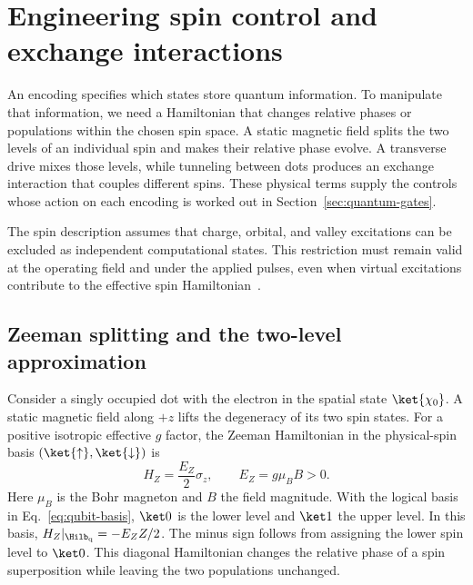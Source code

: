 \section{Engineering spin control and exchange interactions}
\label{sec:spin-control-exchange}

An encoding specifies which states store quantum information.
To manipulate that information, we need a Hamiltonian that changes
relative phases or populations within the chosen spin space.
A static magnetic field splits the two levels of an individual
spin and makes their relative phase evolve. A transverse drive
mixes those levels, while tunneling between dots produces an
exchange interaction that couples different spins. These physical
terms supply the controls whose action on each encoding is worked
out in Section~\ref{sec:quantum-gates}.

The spin description assumes that charge, orbital, and valley
excitations can be excluded as independent computational states.
This restriction must remain valid at the operating field and
under the applied pulses, even when virtual excitations contribute
to the effective spin Hamiltonian~\cite{Burkard2023}.

\subsection{Zeeman splitting and the two-level approximation}
\label{sec:platform-encoding}

Consider a singly occupied dot with the electron in the spatial
state $\ket{\chi_0}$. A static magnetic field along $+z$ lifts the
degeneracy of its two spin states. For a positive isotropic
effective $g$ factor, the Zeeman Hamiltonian in the physical-spin
basis $(\ket{\uparrow},\ket{\downarrow})$ is
\begin{equation}
  H_Z=\frac{E_Z}{2}\sigma_z,
  \qquad E_Z=g\mu_B B>0.
  \label{eq:zeeman}
\end{equation}
Here $\mu_B$ is the Bohr magneton and $B$ the field magnitude.
With the logical basis in Eq.~\eqref{eq:qubit-basis},
$\ket0$ is the lower level and $\ket1$ the upper level.
In this basis, $H_Z|_{\Hilb_{\mathrm q}}=-E_ZZ/2$.
The minus sign follows from assigning the lower spin level to
$\ket0$. This diagonal Hamiltonian changes the relative phase of
a spin superposition while leaving the two populations unchanged.

